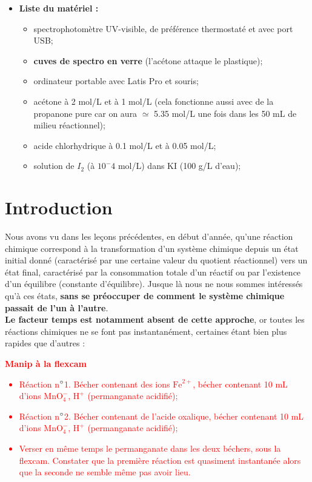 \documentclass[11pt,a4paper]{report}
\begin{document}
\begin{itemize}
	\item \textbf{Liste du matériel :}
	\begin{itemize}
		\item spectrophotomètre UV-visible, de préférence thermostaté et avec port USB;
		\item \textbf{cuves de spectro en verre} (l'acétone attaque le plastique);
		\item ordinateur portable avec Latis Pro et souris;\\
		\item acétone à 2 mol/L et à 1 mol/L (cela fonctionne aussi avec de la propanone pure car 			on aura $\simeq$ 5.35 mol/L une fois dans les 50 mL de milieu réactionnel);
		\item acide chlorhydrique à 0.1 mol/L et à 0.05 mol/L;
		\item solution de $I_2$ (à $10^-4$ mol/L) dans KI (100 g/L d'eau);
	\end{itemize} 
\end{itemize}

\newpage
\section*{Introduction}

Nous avons vu dans les leçons précédentes, en début d'année, qu'une réaction chimique correspond
à la transformation d'un système chimique depuis un état initial donné (caractérisé par une certaine valeur du quotient réactionnel) vers un état final, caractérisé par la consommation totale d'un réactif ou par l'existence d'un équilibre (constante d'équilibre). Jusque là nous ne nous sommes intéressés qu'à ces états, \textbf{sans se préoccuper de comment le système chimique passait de l'un à l'autre}.\\  

\textbf{Le facteur temps est notamment absent de cette approche}, or toutes les réactions chimiques ne se font pas instantanément, certaines étant bien plus rapides que d'autres :\\

\textcolor{red}{\textbf{Manip à la flexcam}
\begin{itemize}
	\item Réaction n$\degree$1. Bécher contenant des ions $\text{Fe}^{2+}$, bécher contenant 10 mL 		d'ions $\text{MnO}_4^-$, $\text{H}^+$ (permanganate acidifié);
	\item Réaction n$\degree$2. Bécher contenant de l'acide oxalique, bécher contenant 10 mL d'ions 
	$\text{MnO}_4^-$, $\text{H}^+$ (permanganate acidifié);
	\item Verser en même temps le permanganate dans les deux béchers, sous la flexcam. Constater 		que la première réaction est quasiment instantanée alors que la seconde ne semble même pas 			avoir lieu.\\
\end{itemize}}
\end{document}
